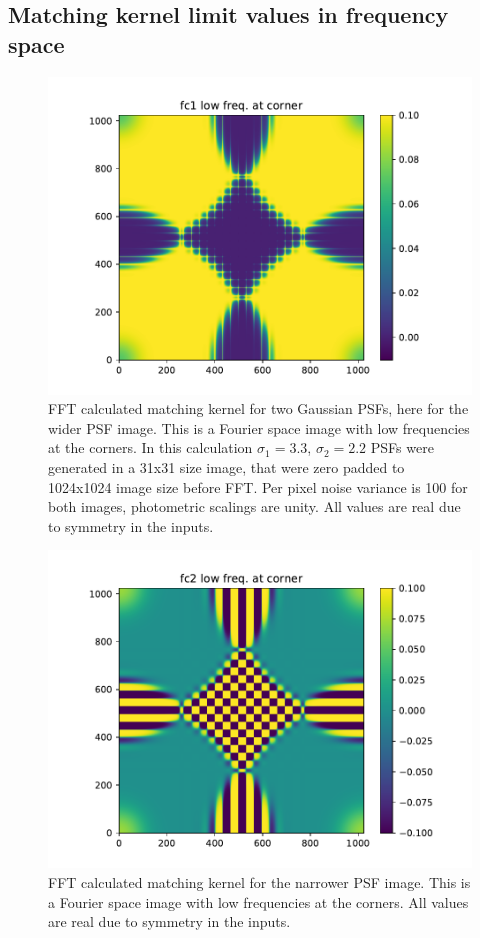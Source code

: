 \documentclass[11pt]{article}
\begin{document}
\subsection{Matching kernel limit values in frequency space\label{sec:FFTlimits}}
\begin{figure}
\begin{center}
\includegraphics[width=5.5in]{fig/fft_steps_fc1.pdf}
\end{center}
\caption{\label{fig:fft_steps_fc1}FFT calculated matching kernel for two
  Gaussian PSFs, here for the wider PSF image. This is a Fourier space image
  with low frequencies at the corners. In this calculation \(\sigma_1=3.3\),
  \(\sigma_2=2.2\) PSFs were generated in a 31x31 size image, that were zero
  padded to 1024x1024 image size before FFT. Per pixel noise variance is 100
  for both images, photometric scalings are unity. All values are real due
  to symmetry in the inputs.}
\end{figure}
%
\begin{figure}
\begin{center}
\includegraphics[width=5.5in]{fig/fft_steps_fc2.pdf}
\end{center}
\caption{\label{fig:fft_steps_fc2}FFT calculated matching kernel for the
  narrower PSF image. This is a Fourier space image with low frequencies at
  the corners. All values are real due to symmetry in the inputs.}
\end{figure}
\end{document}
